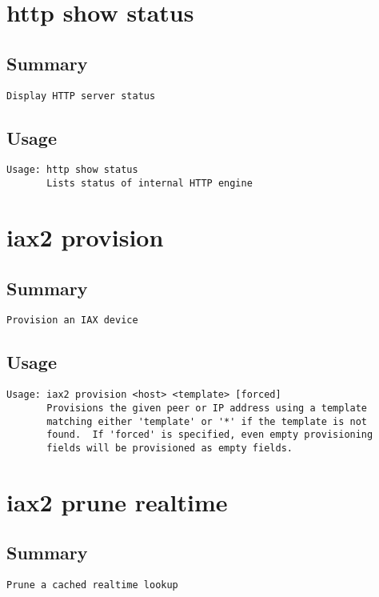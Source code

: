 \section{http show status}
\subsection{Summary}
\begin{verbatim}
Display HTTP server status
\end{verbatim}
\subsection{Usage}
\begin{verbatim}
Usage: http show status
       Lists status of internal HTTP engine

\end{verbatim}


\section{iax2 provision}
\subsection{Summary}
\begin{verbatim}
Provision an IAX device
\end{verbatim}
\subsection{Usage}
\begin{verbatim}
Usage: iax2 provision <host> <template> [forced]
       Provisions the given peer or IP address using a template
       matching either 'template' or '*' if the template is not
       found.  If 'forced' is specified, even empty provisioning
       fields will be provisioned as empty fields.

\end{verbatim}


\section{iax2 prune realtime}
\subsection{Summary}
\begin{verbatim}
Prune a cached realtime lookup
\end{verbatim}
